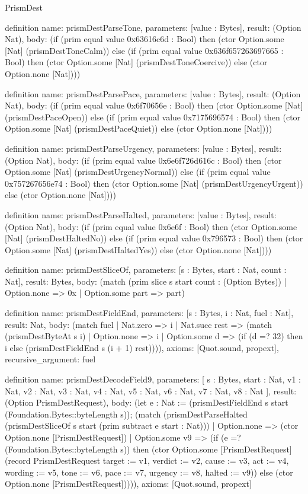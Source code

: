 \begin{lexlean}{PrismDest}
\begin{semanticmodule}
definition{
  name: prismDestParseTone,
  parameters: [value : Bytes],
  result: (Option Nat),
  body: (if (prim equal value 0x63616c6d : Bool) then (ctor Option.some [Nat] (prismDestToneCalm)) else (if (prim equal value 0x636f657263697665 : Bool) then (ctor Option.some [Nat] (prismDestToneCoercive)) else (ctor Option.none [Nat])))
}

definition{
  name: prismDestParsePace,
  parameters: [value : Bytes],
  result: (Option Nat),
  body: (if (prim equal value 0x6f70656e : Bool) then (ctor Option.some [Nat] (prismDestPaceOpen)) else (if (prim equal value 0x7175696574 : Bool) then (ctor Option.some [Nat] (prismDestPaceQuiet)) else (ctor Option.none [Nat])))
}

definition{
  name: prismDestParseUrgency,
  parameters: [value : Bytes],
  result: (Option Nat),
  body: (if (prim equal value 0x6e6f726d616c : Bool) then (ctor Option.some [Nat] (prismDestUrgencyNormal)) else (if (prim equal value 0x757267656e74 : Bool) then (ctor Option.some [Nat] (prismDestUrgencyUrgent)) else (ctor Option.none [Nat])))
}

definition{
  name: prismDestParseHalted,
  parameters: [value : Bytes],
  result: (Option Nat),
  body: (if (prim equal value 0x6e6f : Bool) then (ctor Option.some [Nat] (prismDestHaltedNo)) else (if (prim equal value 0x796573 : Bool) then (ctor Option.some [Nat] (prismDestHaltedYes)) else (ctor Option.none [Nat])))
}

definition{
  name: prismDestSliceOf,
  parameters: [s : Bytes, start : Nat, count : Nat],
  result: Bytes,
  body: (match (prim slice s start count : (Option Bytes))
    | Option.none => 0x
    | Option.some part => part)
}

definition{
  name: prismDestFieldEnd,
  parameters: [s : Bytes, i : Nat, fuel : Nat],
  result: Nat,
  body: (match fuel
    | Nat.zero => i
    | Nat.succ rest => (match (prismDestByteAt s i)
      | Option.none => i
      | Option.some d => (if (d =? 32) then i else (prismDestFieldEnd s (i + 1) rest)))),
  axioms: [Quot.sound, propext],
  recursive_argument: fuel
}

definition{
  name: prismDestDecodeField9,
  parameters: [
    s : Bytes,
    start : Nat,
    v1 : Nat,
    v2 : Nat,
    v3 : Nat,
    v4 : Nat,
    v5 : Nat,
    v6 : Nat,
    v7 : Nat,
    v8 : Nat
  ],
  result: (Option PrismDestRequest),
  body: (let e : Nat := (prismDestFieldEnd s start (Foundation.Bytes::byteLength s)); (match (prismDestParseHalted (prismDestSliceOf s start (prim subtract e start : Nat)))
    | Option.none => (ctor Option.none [PrismDestRequest])
    | Option.some v9 => (if (e =? (Foundation.Bytes::byteLength s)) then (ctor Option.some [PrismDestRequest] (record PrismDestRequest {target := v1, verdict := v2, cause := v3, act := v4, wording := v5, tone := v6, pace := v7, urgency := v8, halted := v9})) else (ctor Option.none [PrismDestRequest])))),
  axioms: [Quot.sound, propext]
}


\end{semanticmodule}
\end{lexlean}
